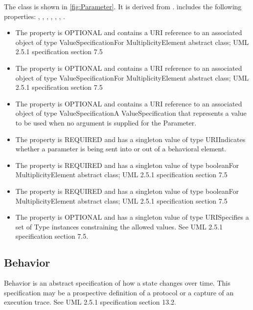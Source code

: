 %
The  class is shown in \ref{fig:Parameter}. It is derived from .%
 includes the following properties: , , , , , , . %
\begin{itemize}%
\item%
The  property is OPTIONAL and contains a URI reference to an associated object of type ValueSpecificationFor MultiplicityElement abstract class; UML 2.5.1 specification section 7.5%
\item%
The  property is OPTIONAL and contains a URI reference to an associated object of type ValueSpecificationFor MultiplicityElement abstract class; UML 2.5.1 specification section 7.5%
\item%
The  property is OPTIONAL and contains a URI reference to an associated object of type ValueSpecificationA ValueSpecification that represents a value to be used when no argument is supplied for the Parameter.%
\item%
The  property is REQUIRED and has a singleton value of type URIIndicates whether a parameter is being sent into or out of a behavioral element.%
\item%
The  property is REQUIRED and has a singleton value of type booleanFor MultiplicityElement abstract class; UML 2.5.1 specification section 7.5%
\item%
The  property is REQUIRED and has a singleton value of type booleanFor MultiplicityElement abstract class; UML 2.5.1 specification section 7.5%
\item%
The  property is OPTIONAL and has a singleton value of type URISpecifies a set of Type instances constraining the allowed values. See UML 2.5.1 specification section 7.5.%
\end{itemize}%
\subsection{Behavior}%
\label{sec:uml:Behavior}%
Behavior is an abstract specification of how a state changes over time. This specification may be a prospective definition of a protocol or a capture of an execution trace. See UML 2.5.1 specification section 13.2.%
\linebreak%
\linebreak%


